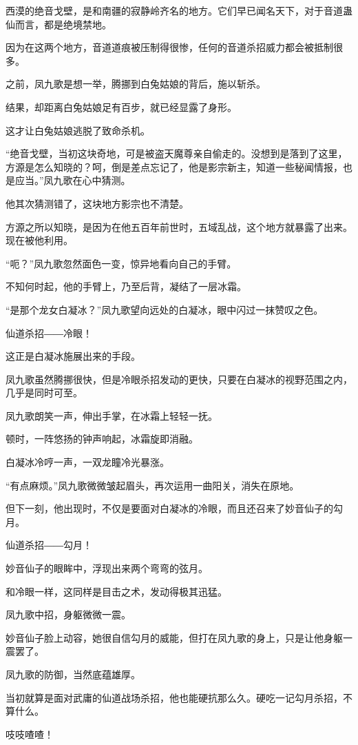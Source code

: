 \begin{this_body}
西漠的绝音戈壁，是和南疆的寂静岭齐名的地方。它们早已闻名天下，对于音道蛊仙而言，都是绝境禁地。

因为在这两个地方，音道道痕被压制得很惨，任何的音道杀招威力都会被抵制很多。

之前，凤九歌是想一举，腾挪到白兔姑娘的背后，施以斩杀。

结果，却距离白兔姑娘足有百步，就已经显露了身形。

这才让白兔姑娘逃脱了致命杀机。

“绝音戈壁，当初这块奇地，可是被盗天魔尊亲自偷走的。没想到是落到了这里，方源是怎么知晓的？呵，倒是差点忘记了，他是影宗新主，知道一些秘闻情报，也是应当。”凤九歌在心中猜测。

他其次猜测错了，这块地方影宗也不清楚。

方源之所以知晓，是因为在他五百年前世时，五域乱战，这个地方就暴露了出来。现在被他利用。

“呃？”凤九歌忽然面色一变，惊异地看向自己的手臂。

不知何时起，他的手臂上，乃至后背，凝结了一层冰霜。

“是那个龙女白凝冰？”凤九歌望向远处的白凝冰，眼中闪过一抹赞叹之色。

仙道杀招――冷眼！

这正是白凝冰施展出来的手段。

凤九歌虽然腾挪很快，但是冷眼杀招发动的更快，只要在白凝冰的视野范围之内，几乎是同时可至。

凤九歌朗笑一声，伸出手掌，在冰霜上轻轻一抚。

顿时，一阵悠扬的钟声响起，冰霜旋即消融。

白凝冰冷哼一声，一双龙瞳冷光暴涨。

“有点麻烦。”凤九歌微微皱起眉头，再次运用一曲阳关，消失在原地。

但下一刻，他出现时，不仅是要面对白凝冰的冷眼，而且还召来了妙音仙子的勾月。

仙道杀招――勾月！

妙音仙子的眼眸中，浮现出来两个弯弯的弦月。

和冷眼一样，这同样是目击之术，发动得极其迅猛。

凤九歌中招，身躯微微一震。

妙音仙子脸上动容，她很自信勾月的威能，但打在凤九歌的身上，只是让他身躯一震罢了。

凤九歌的防御，当然底蕴雄厚。

当初就算是面对武庸的仙道战场杀招，他也能硬抗那么久。硬吃一记勾月杀招，不算什么。

吱吱喳喳！


\end{this_body}
